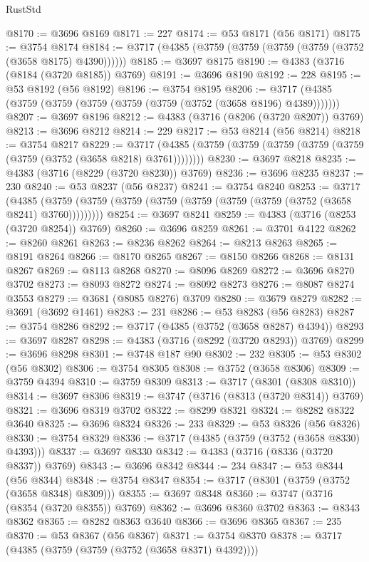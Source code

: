 \begin{lexlean}{RustStd}
\begin{coremodule}
@8170 := @3696 @8169
@8171 := 227
@8174 := @53 @8171 (@56 @8171)
@8175 := @3754 @8174
@8184 := @3717 (@4385 (@3759 (@3759 (@3759 (@3759 (@3752 (@3658 @8175) @4390))))))
@8185 := @3697 @8175
@8190 := @4383 (@3716 (@8184 (@3720 @8185)) @3769)
@8191 := @3696 @8190
@8192 := 228
@8195 := @53 @8192 (@56 @8192)
@8196 := @3754 @8195
@8206 := @3717 (@4385 (@3759 (@3759 (@3759 (@3759 (@3759 (@3752 (@3658 @8196) @4389)))))))
@8207 := @3697 @8196
@8212 := @4383 (@3716 (@8206 (@3720 @8207)) @3769)
@8213 := @3696 @8212
@8214 := 229
@8217 := @53 @8214 (@56 @8214)
@8218 := @3754 @8217
@8229 := @3717 (@4385 (@3759 (@3759 (@3759 (@3759 (@3759 (@3759 (@3752 (@3658 @8218) @3761))))))))
@8230 := @3697 @8218
@8235 := @4383 (@3716 (@8229 (@3720 @8230)) @3769)
@8236 := @3696 @8235
@8237 := 230
@8240 := @53 @8237 (@56 @8237)
@8241 := @3754 @8240
@8253 := @3717
    (@4385 (@3759 (@3759 (@3759 (@3759 (@3759 (@3759 (@3759 (@3752 (@3658 @8241) @3760)))))))))
@8254 := @3697 @8241
@8259 := @4383 (@3716 (@8253 (@3720 @8254)) @3769)
@8260 := @3696 @8259
@8261 := @3701 @4122
@8262 := @8260 @8261
@8263 := @8236 @8262
@8264 := @8213 @8263
@8265 := @8191 @8264
@8266 := @8170 @8265
@8267 := @8150 @8266
@8268 := @8131 @8267
@8269 := @8113 @8268
@8270 := @8096 @8269
@8272 := @3696 @8270 @3702
@8273 := @8093 @8272
@8274 := @8092 @8273
@8276 := @8087 @8274 @3553
@8279 := @3681 (@8085 @8276) @3709
@8280 := @3679 @8279
@8282 := @3691 (@3692 @1461)
@8283 := 231
@8286 := @53 @8283 (@56 @8283)
@8287 := @3754 @8286
@8292 := @3717 (@4385 (@3752 (@3658 @8287) @4394))
@8293 := @3697 @8287
@8298 := @4383 (@3716 (@8292 (@3720 @8293)) @3769)
@8299 := @3696 @8298
@8301 := @3748 @187 @90
@8302 := 232
@8305 := @53 @8302 (@56 @8302)
@8306 := @3754 @8305
@8308 := @3752 (@3658 @8306)
@8309 := @3759 @4394
@8310 := @3759 @8309
@8313 := @3717 (@8301 (@8308 @8310))
@8314 := @3697 @8306
@8319 := @3747 (@3716 (@8313 (@3720 @8314)) @3769)
@8321 := @3696 @8319 @3702
@8322 := @8299 @8321
@8324 := @8282 @8322 @3640
@8325 := @3696 @8324
@8326 := 233
@8329 := @53 @8326 (@56 @8326)
@8330 := @3754 @8329
@8336 := @3717 (@4385 (@3759 (@3752 (@3658 @8330) @4393)))
@8337 := @3697 @8330
@8342 := @4383 (@3716 (@8336 (@3720 @8337)) @3769)
@8343 := @3696 @8342
@8344 := 234
@8347 := @53 @8344 (@56 @8344)
@8348 := @3754 @8347
@8354 := @3717 (@8301 (@3759 (@3752 (@3658 @8348) @8309)))
@8355 := @3697 @8348
@8360 := @3747 (@3716 (@8354 (@3720 @8355)) @3769)
@8362 := @3696 @8360 @3702
@8363 := @8343 @8362
@8365 := @8282 @8363 @3640
@8366 := @3696 @8365
@8367 := 235
@8370 := @53 @8367 (@56 @8367)
@8371 := @3754 @8370
@8378 := @3717 (@4385 (@3759 (@3759 (@3752 (@3658 @8371) @4392))))

\end{coremodule}
\end{lexlean}
